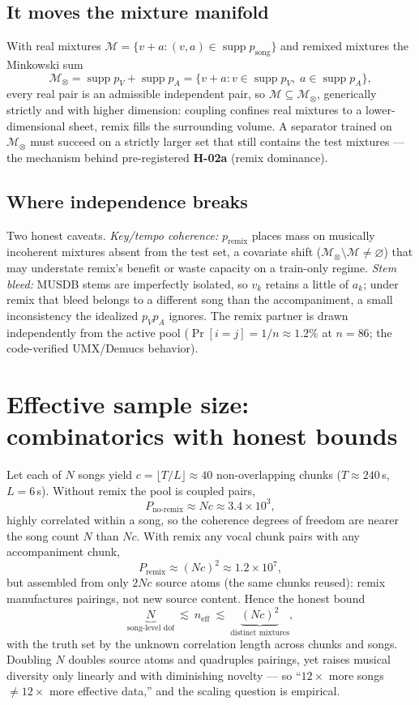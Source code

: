 \documentclass[11pt]{article}
\newcommand{\supp}{\operatorname{supp}}
\begin{document}
\subsection{It moves the mixture manifold}

With real mixtures $\mathcal M=\{v+a:(v,a)\in\supp p_{\text{song}}\}$ and remixed
mixtures the Minkowski sum
\[
\mathcal M_{\otimes}=\supp p_V+\supp p_A
=\{v+a:v\in\supp p_V,\;a\in\supp p_A\},
\]
every real pair is an admissible independent pair, so
$\mathcal M\subseteq\mathcal M_{\otimes}$, generically strictly and with higher
dimension: coupling confines real mixtures to a lower-dimensional sheet, remix fills
the surrounding volume. A separator trained on $\mathcal M_{\otimes}$ must succeed on
a strictly larger set that still contains the test mixtures --- the mechanism behind
pre-registered \textbf{H-02a} (remix dominance).

\subsection{Where independence breaks}

Two honest caveats. \emph{Key/tempo coherence:} $p_{\text{remix}}$ places mass on
musically incoherent mixtures absent from the test set, a covariate shift
($\mathcal M_{\otimes}\setminus\mathcal M\neq\varnothing$) that may understate remix's
benefit or waste capacity on a train-only regime. \emph{Stem bleed:} MUSDB stems are
imperfectly isolated, so $v_k$ retains a little of $a_k$; under remix that bleed
belongs to a different song than the accompaniment, a small inconsistency the
idealized $p_Vp_A$ ignores. The remix partner is drawn independently from the active
pool ($\Pr[i=j]=1/n\approx1.2\%$ at $n=86$; the code-verified UMX/Demucs behavior).

\section{Effective sample size: combinatorics with honest bounds}

Let each of $N$ songs yield $c=\lfloor T/L\rfloor\approx40$ non-overlapping chunks
($T\approx240$\,s, $L=6$\,s). Without remix the pool is coupled pairs,
\[
P_{\text{no-remix}}\approx Nc\approx 3.4\times10^{3},
\]
highly correlated within a song, so the coherence degrees of freedom are nearer the
song count $N$ than $Nc$. With remix any vocal chunk pairs with any accompaniment
chunk,
\[
P_{\text{remix}}\approx (Nc)^2\approx 1.2\times10^{7},
\]
but assembled from only $2Nc$ source atoms (the same chunks reused): remix
manufactures pairings, not new source content. Hence the honest bound
\[
\underbrace{N}_{\text{song-level dof}}\ \lesssim\ n_{\text{eff}}\ \lesssim\
\underbrace{(Nc)^2}_{\text{distinct mixtures}},
\]
with the truth set by the unknown correlation length across chunks and songs.
Doubling $N$ doubles source atoms and quadruples pairings, yet raises musical
diversity only linearly and with diminishing novelty --- so ``$12\times$ more songs
$\neq 12\times$ more effective data,'' and the scaling question is empirical.
\end{document}
